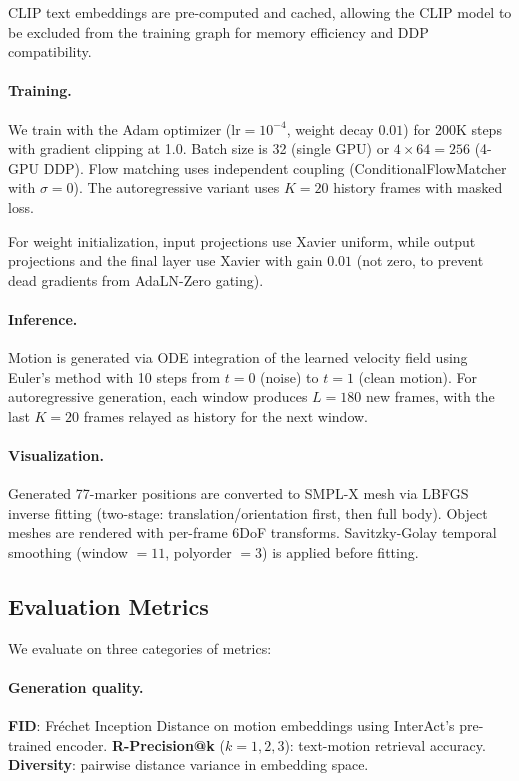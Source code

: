 CLIP text embeddings are pre-computed and cached, allowing the CLIP model to be excluded from the training graph for memory efficiency and DDP compatibility.

\paragraph{Training.}
We train with the Adam optimizer ($\text{lr}{=}10^{-4}$, weight decay $0.01$) for 200K steps with gradient clipping at 1.0. Batch size is 32 (single GPU) or $4 {\times} 64 = 256$ (4-GPU DDP). Flow matching uses independent coupling (ConditionalFlowMatcher with $\sigma{=}0$). The autoregressive variant uses $K{=}20$ history frames with masked loss.

For weight initialization, input projections use Xavier uniform, while output projections and the final layer use Xavier with gain $0.01$ (not zero, to prevent dead gradients from AdaLN-Zero gating).

\paragraph{Inference.}
Motion is generated via ODE integration of the learned velocity field using Euler's method with 10 steps from $t{=}0$ (noise) to $t{=}1$ (clean motion). For autoregressive generation, each window produces $L{=}180$ new frames, with the last $K{=}20$ frames relayed as history for the next window.

\paragraph{Visualization.}
Generated 77-marker positions are converted to SMPL-X mesh via LBFGS inverse fitting (two-stage: translation/orientation first, then full body). Object meshes are rendered with per-frame 6DoF transforms. Savitzky-Golay temporal smoothing (window $= 11$, polyorder $= 3$) is applied before fitting.


\subsection{Evaluation Metrics}
\label{sec:metrics}

We evaluate on three categories of metrics:

\paragraph{Generation quality.}
\textbf{FID}: Fr\'{e}chet Inception Distance on motion embeddings using InterAct's pre-trained encoder.
\textbf{R-Precision@k} ($k{=}1,2,3$): text-motion retrieval accuracy.
\textbf{Diversity}: pairwise distance variance in embedding space.

